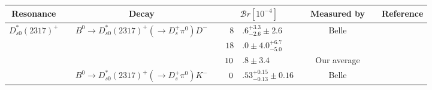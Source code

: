 \begin{adjustbox}{width=\textwidth,center}
{\setlength\tabcolsep{0pt}
	\begin{tabular}{cp{5pt}cp{5pt}r@{}lp{5pt}cp{5pt}c}
		\toprule
		\rowcolor{Gray} Resonance &   & Decay &   & \multicolumn{2}{c}{$\mathcal{B}r[10^{-4}]$} &   & \multicolumn{1}{c}{Measured by} &   & \multicolumn{1}{c}{Reference} \\ \midrule								
	\multirow{4}{*}[-5pt]{$D_{s0}^{*}(2317)^{+}$}	&&	\multirow{3}{*}{$B^{0}\to D_{s0}^{*}(2317)^{+}(\to D^{+}_{s}\pi^{0})D^{-}$}	&&$	8$&$.6^{+3.3}_{-2.6}\pm2.6	$&&	Belle	&&	\cite{Krokovny:2003zq}        \\
		&&		&&$	18$&$.0\pm 4.0{}^{+6.7}_{-5.0}	$&&	\babar{}	&&	\cite{Aubert:2004pw}          \\  \cmidrule{4-9}
		&&		&\cellcolor{Gray}&$	\cellcolor{Gray}10$&\cellcolor{Gray}$.8 \pm 3.4	$&\cellcolor{Gray}&	\cellcolor{Gray}  Our average	&\cellcolor{Gray}&	\\ \cmidrule{3-9}
		&&	\multirow{1}{*}{$B^{0}\to D_{s0}^{*}(2317)^{+}(\to D^{+}_{s}\pi^{0})K^{-}$}	&\cellcolor{LightGray} &$	\cellcolor{LightGray}  0$&\cellcolor{LightGray}$.53^{+0.15}_{-0.13}\pm0.16	$&\cellcolor{LightGray}&	\cellcolor{LightGray}  Belle	&\cellcolor{LightGray}&	\cite{Abe:2004wz}             \\ \midrule
									

\end{tabular}}
\end{adjustbox}
